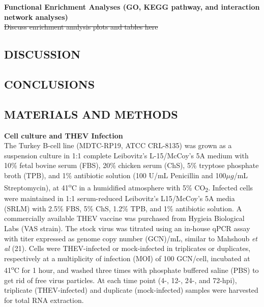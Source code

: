 \documentclass[
]{article}
\begin{document}
\textbf{Functional Enrichment Analyses (GO, KEGG pathway, and
interaction network analyses)}\\
\st{Discuss enrichment analysis plots and tables here} \newpage

\subsection{DISCUSSION}\label{discussion}

\newpage

\subsection{CONCLUSIONS}\label{conclusions}

\newpage

\subsection{MATERIALS AND METHODS}\label{materials-and-methods}

\textbf{Cell culture and THEV Infection}\\
The Turkey B-cell line (MDTC-RP19, ATCC CRL-8135) was grown as a
suspension culture in 1:1 complete Leibovitz's L-15/McCoy's 5A medium
with 10\% fetal bovine serum (FBS), 20\% chicken serum (ChS), 5\%
tryptose phosphate broth (TPB), and 1\% antibiotic solution (100 U/mL
Penicillin and 100\(\mu g\)/mL Streptomycin), at 41\textsuperscript{o}C
in a humidified atmosphere with 5\% CO\textsubscript{2}. Infected cells
were maintained in 1:1 serum-reduced Leibovitz's L15/McCoy's 5A media
(SRLM) with 2.5\% FBS, 5\% ChS, 1.2\% TPB, and 1\% antibiotic solution.
A commercially available THEV vaccine was purchased from Hygieia
Biological Labs (VAS strain). The stock virus was titrated using an
in-house qPCR assay with titer expressed as genome copy number (GCN)/mL,
similar to Mahshoub \emph{et al} (21). Cells were THEV-infected or
mock-infected in triplicates or duplicates, respectively at a
multiplicity of infection (MOI) of 100 GCN/cell, incubated at
41\textsuperscript{o}C for 1 hour, and washed three times with phosphate
buffered saline (PBS) to get rid of free virus particles. At each time
point (4-, 12-, 24-, and 72-hpi), triplicate (THEV-infected) and
duplicate (mock-infected) samples were harvested for total RNA
extraction.
\end{document}
